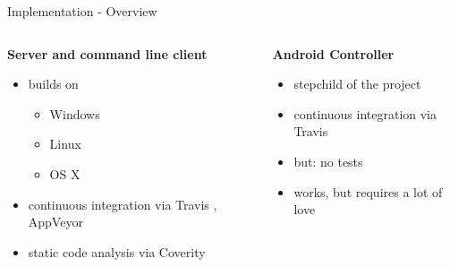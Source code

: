 \documentclass[a4paper]{beamer}
\begin{document}
\begin{frame}{Implementation - Overview}
    \begin{columns}[t]
        \begin{column}{0.48\textwidth}
            \textbf{Server and command line client}

            \begin{itemize}
                \item builds on
                    \begin{itemize}
                        \item Windows
                        \item Linux
                        \item OS X
                    \end{itemize}
                \item continuous integration via Travis \cite{travis}, AppVeyor \cite{appveyor}
                \item static code analysis via Coverity \cite{coverity}
            \end{itemize}
        \end{column}
        \begin{column}{0.48\textwidth}
            \textbf{Android Controller}

            \begin{itemize}
                \item stepchild of the project
                \item continuous integration via Travis
                \item but: no tests
                \item works, but requires a lot of love
            \end{itemize}
        \end{column}
    \end{columns}
\end{frame}
\end{document}
